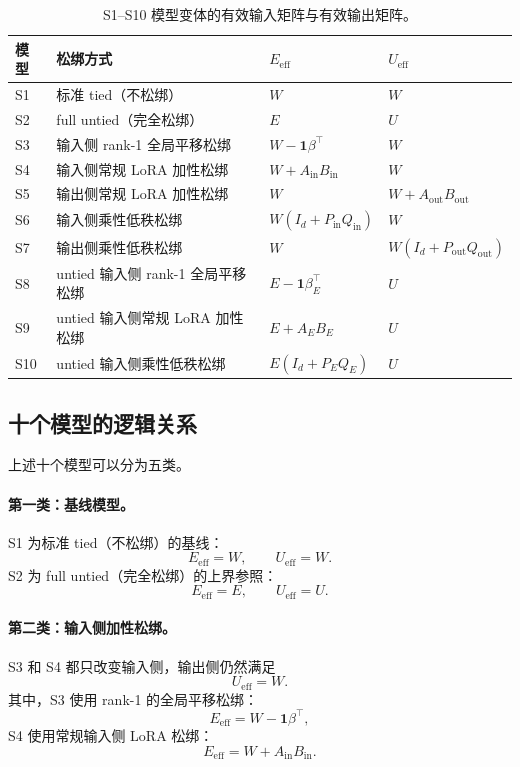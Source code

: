 \begin{table}[htbp]
\centering
\caption{S1--S10 模型变体的有效输入矩阵与有效输出矩阵。}
\label{tab:s1_s10_variants}
\begin{tabular}{llll}
\toprule
模型 & 松绑方式 & $E_{\mathrm{eff}}$ & $U_{\mathrm{eff}}$ \\
\midrule
S1 & 标准 tied（不松绑） & $W$ & $W$ \\
S2 & full untied（完全松绑） & $E$ & $U$ \\
S3 & 输入侧 rank-1 全局平移松绑 & $W-\mathbf{1}\beta^\top$ & $W$ \\
S4 & 输入侧常规 LoRA 加性松绑 & $W+A_{\mathrm{in}}B_{\mathrm{in}}$ & $W$ \\
S5 & 输出侧常规 LoRA 加性松绑 & $W$ & $W+A_{\mathrm{out}}B_{\mathrm{out}}$ \\
S6 & 输入侧乘性低秩松绑 & $W(I_d+P_{\mathrm{in}}Q_{\mathrm{in}})$ & $W$ \\
S7 & 输出侧乘性低秩松绑 & $W$ & $W(I_d+P_{\mathrm{out}}Q_{\mathrm{out}})$ \\
S8 & untied 输入侧 rank-1 全局平移松绑 & $E-\mathbf{1}\beta_E^\top$ & $U$ \\
S9 & untied 输入侧常规 LoRA 加性松绑 & $E+A_EB_E$ & $U$ \\
S10 & untied 输入侧乘性低秩松绑 & $E(I_d+P_EQ_E)$ & $U$ \\
\bottomrule
\end{tabular}
\end{table}

\subsection{十个模型的逻辑关系}

上述十个模型可以分为五类。

\paragraph{第一类：基线模型。}
S1 为标准 tied（不松绑）的基线：
\begin{equation}
    E_{\mathrm{eff}} = W, \qquad
    U_{\mathrm{eff}} = W.
\end{equation}
S2 为 full untied（完全松绑）的上界参照：
\begin{equation}
    E_{\mathrm{eff}} = E, \qquad
    U_{\mathrm{eff}} = U.
\end{equation}

\paragraph{第二类：输入侧加性松绑。}
S3 和 S4 都只改变输入侧，输出侧仍然满足
\begin{equation}
    U_{\mathrm{eff}} = W.
\end{equation}
其中，S3 使用 rank-1 的全局平移松绑：
\begin{equation}
    E_{\mathrm{eff}} = W-\mathbf{1}\beta^\top,
\end{equation}
S4 使用常规输入侧 LoRA 松绑：
\begin{equation}
    E_{\mathrm{eff}} = W+A_{\mathrm{in}}B_{\mathrm{in}}.
\end{equation}

